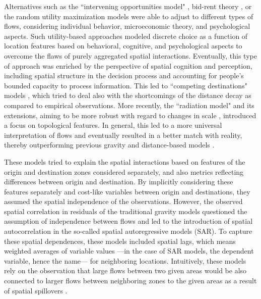 Alternatives such as the ``intervening opportunities model" \citep{Stouffer1940InterveningDistance}, bid-rent theory \citep{Alonso1964LocationRent}, or the random utility maximization models \citep{Block1959RandomResponse} were able to adjust to different types of flows, considering individual behavior, microeconomic theory, and psychological aspects. Such utility-based approaches modeled discrete choice \citep{McFadden1974ConditionalBehavior, Ben-Akiva1985DiscreteDemand} as a function of location features based on behavioral, cognitive, and psychological aspects to overcome the flaws of purely aggregated spatial interactions. 
Eventually, this type of approach was enriched by the perspective of spatial cognition and perception, including spatial structure in the decision process and accounting for people's bounded capacity to process information. This led to ``competing destinations" models \citep{Fotheringham1983ADestinations}, which tried to deal also with the shortcomings of the distance decay as compared to empirical observations.
More recently, the ``radiation model" \citep{Simini2012APatterns} and its extensions, aiming to be more robust with regard to changes in scale \citep{Simini2013HumanApproach, Yang2014LimitsCalibration}, introduced a focus on topological features. In general, this led to a more universal interpretation of flows \citep{Masucci2013GravityFlows} and eventually resulted in a better match with reality, thereby outperforming previous gravity and distance-based models \citep{Noulas2012AMobility}.

These models tried to explain the spatial interactions based on features of the origin and destination zones considered separately, and also metrics reflecting differences between origin and destination. By implicitly considering these features separately and cost-like variables between origin and destinations, they assumed the spatial independence of the observations. However, the observed spatial correlation in residuals of the traditional gravity models \citep{Moran1950NotesPhenomena.,Curry1972AFlows, Griffith1980ExplorationsInteraction.} questioned the assumption of independence between flows and led to the introduction of spatial autocorrelation in the so-called spatial autoregressive models (SAR). To capture these spatial dependences, these models included spatial lags, which means weighted averages of variable values ---in the case of SAR models, the dependent variable, hence the name--- for neighboring locations. Intuitively, these models rely on the observation that large flows between two given areas would be also connected to larger flows between neighboring zones to the given areas as a result of spatial spillovers \citep{LeSage2008SpatialFlows}.

